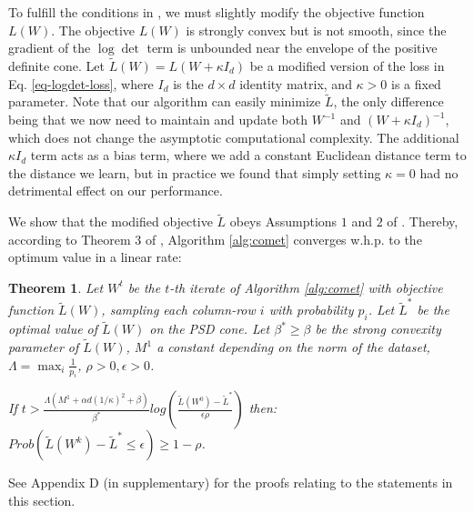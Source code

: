 \documentclass{article} %
\newcommand\mat[1]{{#1}}
\newcommand{\W}{\mat{W}}
\newcommand{\tL}{\tilde{L}(\W)}
\newtheorem{theorem}{Theorem}
\begin{document}
To fulfill the conditions in \cite{richtarik2013optimal}, we must slightly modify the objective function $L({\W})$. The objective $L(\W)$ is strongly convex but is not smooth, since the gradient of the $\log \det$ term is unbounded near the envelope of the positive definite cone. Let $\tilde{L}({\W}) = L({\W + \kappa I_d})$ be a modified version of the loss in Eq. \ref{eq-logdet-loss}, where $I_d$ is the $d \times d$ identity matrix, and $\kappa>0$ is a fixed parameter.
Note that our algorithm can easily minimize $\tilde{L}$, the only difference being that we now need to maintain and update both $\W^{-1}$ and $(\W+\kappa I_d)^{-1}$, which does not change the asymptotic computational complexity. The additional $\kappa I_d$ term acts as a bias term, where we add a constant Euclidean distance term to the distance we learn, but in practice we found that simply setting $\kappa=0$ had no detrimental effect on our performance. 

We show that the modified objective $\tilde{L}$ obeys Assumptions $1$ and $2$ of \citet{richtarik2013optimal}. Thereby, according to Theorem 3 of \citeauthor{richtarik2013optimal}, Algorithm \ref{alg:comet} converges w.h.p. to the optimum value in a linear rate:

\begin{theorem}
Let $\W^t$ be the $t$-th iterate of Algorithm \ref{alg:comet} with objective function $\tL$, sampling each column-row $i$ with probability $p_i$. Let $\tilde{L}^*$ be the optimal value of $\tL$ on the PSD cone. Let $\beta^* \geq \beta$ be the strong convexity parameter of $\tL$, $M^1$ a constant depending on the norm of the dataset, $\Lambda = \max_i \frac{1}{p_i}$, $\rho >0, \epsilon>0$.

If $t > \frac{\Lambda (M^1 + \alpha d (1/\kappa)^2 + \beta)}{\beta^*} log \left( \frac{\tilde{L}(W^0) - \tilde{L}^*}{\epsilon \rho}\right)$ then: $Prob(\tilde{L}(\W^k) - \tilde{L}^* \leq \epsilon) \geq 1-\rho$.
\end{theorem}
See Appendix D (in supplementary) for the proofs relating to the statements in this section.
\end{document}
